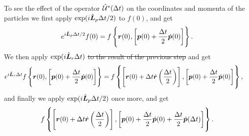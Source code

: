 To see the effect of the operator $\hat{\mathcal{U}}^*(\Delta t)$ on the coordinates and momenta of the particles we first apply $\exp(i\hat{\boldsymbol{L}}_p\Delta t/2)$ to $f(0)$, and get
\begin{align*}
    e^{i\hat{\boldsymbol{L}}_p \Delta t/2} f(0) = f \left\{ \boldsymbol{r}(0), \left[ \boldsymbol{p}(0) + \frac{\Delta t}{2} \dot{\boldsymbol{p}}(0) \right] \right\}.
\end{align*}
We then apply $\exp(i\hat{\boldsymbol{L}}_r\Delta t)$ \st{to the result of the previous step} and get
\begin{align*}
     e^{i\hat{\boldsymbol{L}}_r \Delta t} f \left\{ \boldsymbol{r}(0), \left[ \boldsymbol{p}(0) + \frac{\Delta t}{2}\dot{\boldsymbol{p}}(0) \right] \right\}
     &= f \left\{ \left[ \boldsymbol{r}(0) + \Delta t \dot{\boldsymbol{r}}\left(\frac{\Delta t}{2}\right) \right], \left[ \boldsymbol{p}(0) + \frac{\Delta t}{2}\dot{\boldsymbol{p}}(0) \right] \right\},
\end{align*}
and finally we apply $\exp(i\hat{\boldsymbol{L}}_p\Delta t/2)$ once more, and get
\begin{align*}
    f \left\{ 
        \left[ \boldsymbol{r}(0) + \Delta t \dot{\boldsymbol{r}}\left(\frac{\Delta t}{2}\right) \right], 
        \left[ \boldsymbol{p}(0) + \frac{\Delta t}{2}\dot{\boldsymbol{p}}(0) + \frac{\Delta t}{2}\dot{\boldsymbol{p}}(\Delta t) \right] 
    \right\}.
\end{align*}



